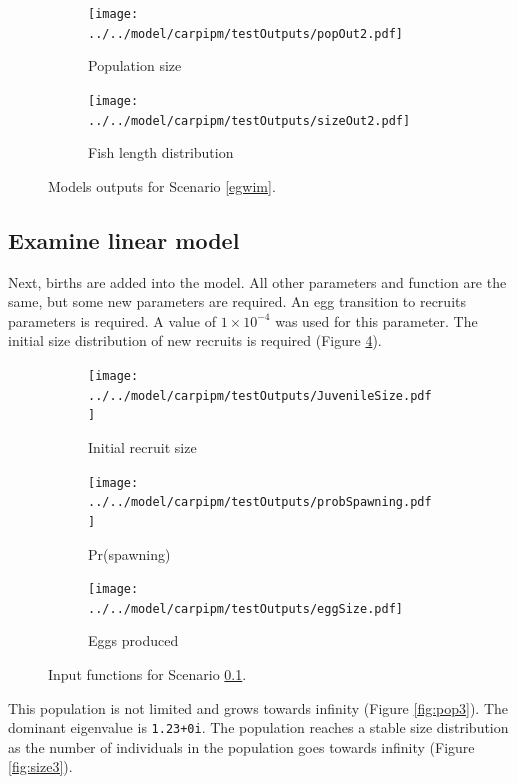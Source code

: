 \documentclass{article}[12pt]
\begin{document}
\begin{figure}[htbp]
	\centering
	\begin{subfigure}[b]{0.3\textwidth}
		\texttt{[image: ../../model/carpipm/testOutputs/popOut2.pdf]} 
		\caption{Population size} 
		\label{fig:pop2}
	\end{subfigure}
	\qquad
	\begin{subfigure}[b]{0.3\textwidth}
		\texttt{[image: ../../model/carpipm/testOutputs/sizeOut2.pdf]} 
		\caption{Fish length distribution} 
		\label{fig:size2}
	\end{subfigure}
   \caption{Models outputs for Scenario \ref{egwim}.}
   \label{fig:scn2out}
\end{figure}


\subsection{Examine linear model}\label{egwimb}


Next, births are added into the model. 
All other parameters and function are the same, but some new parameters are required. 
An egg transition to recruits parameters is required.
A value of \(1\times 10^{-4}\) was used for this parameter. 
The initial size distribution of new recruits is required (Figure \ref{fig:suv3}). 

\begin{figure}[htbp]
	\centering
	\begin{subfigure}[b]{0.45\textwidth}
		\texttt{[image: ../../model/carpipm/testOutputs/JuvenileSize.pdf]} 
		\caption{Initial recruit size} 
		\label{fig:suv3}
	\end{subfigure}
	\qquad
	\begin{subfigure}[b]{0.45\textwidth}
		\texttt{[image: ../../model/carpipm/testOutputs/probSpawning.pdf]} 
		\caption{Pr(spawning)} 
		\label{fig:grow3}
	\end{subfigure}
	\qquad
	\begin{subfigure}[b]{0.45\textwidth}
		\texttt{[image: ../../model/carpipm/testOutputs/eggSize.pdf]} 
		\caption{Eggs produced } 
		\label{fig:ip3}
	\end{subfigure}
   \caption{Input functions for Scenario \ref{egwimb}.}
   \label{fig:scn3}
\end{figure}

This population is not limited and grows towards infinity (Figure \ref{fig:pop3}).
The dominant eigenvalue is \texttt{1.23+0i}.
The population reaches a stable size distribution as the number of individuals in the population goes towards infinity (Figure \ref{fig:size3}). 
\end{document}
